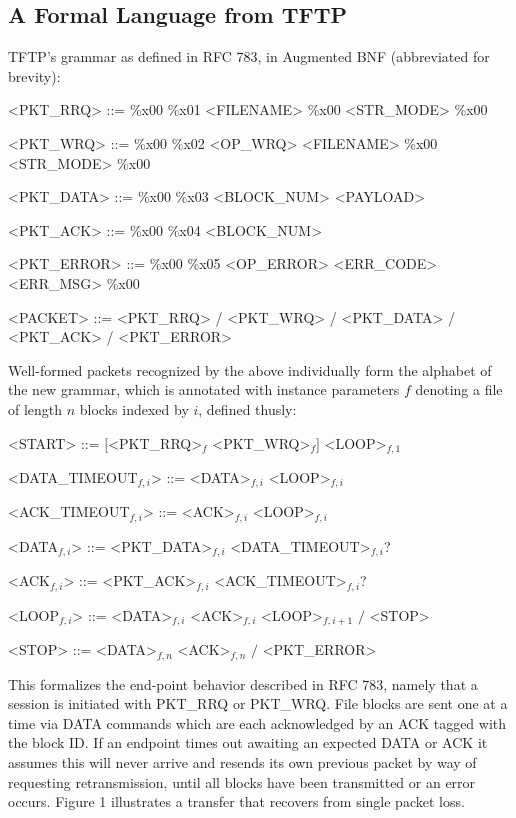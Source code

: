 \documentclass[a0,landscape]{a0poster}
\begin{document}
\begin{multicols}{4}
\section*{A Formal Language from TFTP}

TFTP's grammar as defined in RFC 783, in Augmented BNF (abbreviated for brevity):
\begin{grammar}
%
%
%
%
%
%
<PKT\_RRQ> ::= \%x00 \%x01 <FILENAME> \%x00 <STR\_MODE> \%x00

<PKT\_WRQ> ::= \%x00 \%x02 <OP\_WRQ> <FILENAME> \%x00 <STR\_MODE> \%x00

<PKT\_DATA> ::= \%x00 \%x03 <BLOCK\_NUM> <PAYLOAD>

<PKT\_ACK> ::= \%x00 \%x04 <BLOCK\_NUM>

<PKT\_ERROR> ::= \%x00 \%x05 <OP\_ERROR> <ERR\_CODE> <ERR\_MSG> \%x00

<PACKET> ::= <PKT\_RRQ> / <PKT\_WRQ> / <PKT\_DATA> / <PKT\_ACK> / <PKT\_ERROR>
\end{grammar}

Well-formed packets recognized by the above individually form the alphabet of the new grammar, which is annotated with instance parameters $f$ denoting a file of length $n$ blocks indexed by $i$, defined thusly:

\begin{grammar}
<START> ::= $\big[$<PKT\_RRQ>$_{f}$ <PKT\_WRQ>$_{f}\big]$ <LOOP>$_{f,1}$

<DATA\_TIMEOUT$_{f,i}$> ::= <DATA>$_{f,i}$ <LOOP>$_{f,i}$

<ACK\_TIMEOUT$_{f,i}$> ::= <ACK>$_{f,i}$ <LOOP>$_{f,i}$

<DATA$_{f,i}$> ::= <PKT\_DATA>$_{f,i}$ <DATA\_TIMEOUT>$_{f,i}$?

<ACK$_{f,i}$> ::= <PKT\_ACK>$_{f,i}$ <ACK\_TIMEOUT>$_{f,i}$?

<LOOP$_{f,i}$> ::= <DATA>$_{f,i}$ <ACK>$_{f,i}$ <LOOP>$_{f,i+1}$ $\big/$ <STOP>

<STOP> ::= <DATA>$_{f,n}$ <ACK>$_{f,n}$ $\big/$ <PKT\_ERROR>
\end{grammar}

This formalizes the end-point behavior described in RFC 783, namely that a session is initiated with PKT\_RRQ or PKT\_WRQ. File blocks are sent one at a time via DATA commands which are each acknowledged by an ACK tagged with the block ID. If an endpoint times out awaiting an expected DATA or ACK it assumes this will never arrive and resends its own previous packet by way of requesting retransmission, until all blocks have been transmitted or an error occurs. Figure 1 illustrates a transfer that recovers from single packet loss.


\end{multicols}
\end{document}
